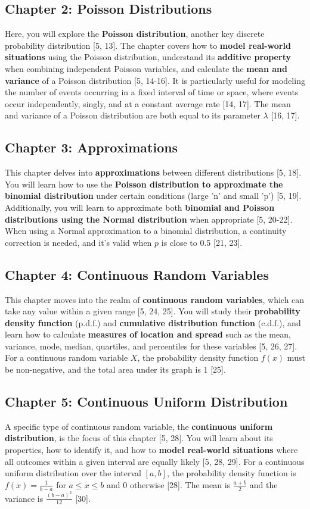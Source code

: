 \documentclass{article}
\begin{document}
\subsection*{Chapter 2: Poisson Distributions}
Here, you will explore the \textbf{Poisson distribution}, another key discrete probability distribution [5, 13]. The chapter covers how to \textbf{model real-world situations} using the Poisson distribution, understand its \textbf{additive property} when combining independent Poisson variables, and calculate the \textbf{mean and variance} of a Poisson distribution [5, 14-16]. It is particularly useful for modeling the number of events occurring in a fixed interval of time or space, where events occur independently, singly, and at a constant average rate [14, 17]. The mean and variance of a Poisson distribution are both equal to its parameter $\lambda$ [16, 17].

\subsection*{Chapter 3: Approximations}
This chapter delves into \textbf{approximations} between different distributions [5, 18]. You will learn how to use the \textbf{Poisson distribution to approximate the binomial distribution} under certain conditions (large 'n' and small 'p') [5, 19]. Additionally, you will learn to approximate both \textbf{binomial and Poisson distributions using the Normal distribution} when appropriate [5, 20-22]. When using a Normal approximation to a binomial distribution, a continuity correction is needed, and it's valid when $p$ is close to 0.5 [21, 23].

\subsection*{Chapter 4: Continuous Random Variables}
This chapter moves into the realm of \textbf{continuous random variables}, which can take any value within a given range [5, 24, 25]. You will study their \textbf{probability density function} (p.d.f.) and \textbf{cumulative distribution function} (c.d.f.), and learn how to calculate \textbf{measures of location and spread} such as the mean, variance, mode, median, quartiles, and percentiles for these variables [5, 26, 27]. For a continuous random variable $X$, the probability density function $f(x)$ must be non-negative, and the total area under its graph is 1 [25].

\subsection*{Chapter 5: Continuous Uniform Distribution}
A specific type of continuous random variable, the \textbf{continuous uniform distribution}, is the focus of this chapter [5, 28]. You will learn about its properties, how to identify it, and how to \textbf{model real-world situations} where all outcomes within a given interval are equally likely [5, 28, 29]. For a continuous uniform distribution over the interval $[a, b]$, the probability density function is $f(x) = \frac{1}{b-a}$ for $a \leq x \leq b$ and 0 otherwise [28]. The mean is $\frac{a+b}{2}$ and the variance is $\frac{(b-a)^2}{12}$ [30].
\end{document}
